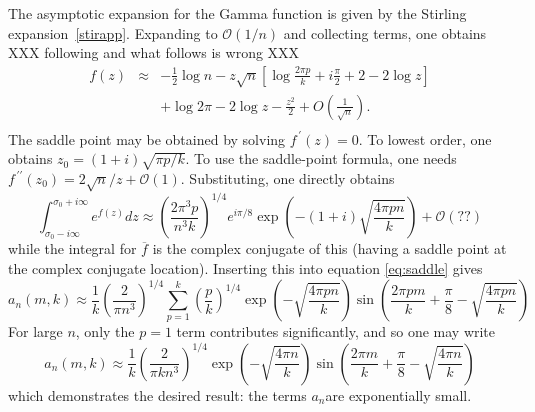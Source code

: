 \documentclass{amsart}
\begin{document}
The asymptotic expansion for the Gamma function is given by the Stirling
expansion~\eqref{stirapp}.
Expanding to $\mathcal{O}(1/n)$
and collecting terms, one obtains XXX following and what follows is
wrong XXX\begin{eqnarray}
f(z) & \approx & -\frac{1}{2}\log n-z\sqrt{n}\left[\log\frac{2\pi p}{k}+i\frac{\pi}{2}+2-2\log z\right]\nonumber \\
 &  & +\log2\pi-2\log z-\frac{z^{2}}{2}+O\left(\frac{1}{\sqrt{n}}\right).\label{eq:}\\
\end{eqnarray}
 The saddle point may be obtained  by solving $f^{\,\prime}(z)=0$.  To
 lowest order, one  obtains $z_{0}=(1+i)\sqrt{\pi  p/k}$. To  use  the
 saddle-point           formula,             one                 needs
 $f^{\,\prime\prime}(z_{0})=2\sqrt{n}/z+\mathcal{O}(1)$.
 Substituting, one directly obtains \begin{equation}
\int_{\sigma_{0}-i\infty}^{\sigma_{0}+i\infty}e^{f(z)}dz\approx\left(\frac{2\pi^{3}p}{n^{3}k}\right)^{1/4}e^{i\pi/8}\exp\left(-(1+i)\sqrt{\frac{4\pi pn}{k}}\right)+\mathcal{O}\left(??\right)\label{eq:}\end{equation}
 while the integral for $\overline{f}$ is the complex conjugate of
this (having a saddle point at the complex conjugate location). Inserting
this into equation \ref{eq:saddle} gives \begin{equation}
a_{n}(m,k)\approx\frac{1}{k}\left(\frac{2}{\pi n^{3}}\right)^{1/4}\sum_{p=1}^{k}\left(\frac{p}{k}\right)^{1/4}\exp\left(-\sqrt{\frac{4\pi pn}{k}}\right)\sin\left(\frac{2\pi pm}{k}+\frac{\pi}{8}-\sqrt{\frac{4\pi pn}{k}}\right)\label{eq:an-p}\end{equation}
For large $n$, only the $p=1$ term contributes significantly, and
so one may write\begin{equation}
a_{n}(m,k)\approx\frac{1}{k}\left(\frac{2}{\pi kn^{3}}\right)^{1/4}\exp\left(-\sqrt{\frac{4\pi n}{k}}\right)\sin\left(\frac{2\pi m}{k}+\frac{\pi}{8}-\sqrt{\frac{4\pi n}{k}}\right)\label{eq:}\end{equation}
 which demonstrates the desired result: the terms $a_{n}$are exponentially
small.
\end{document}

